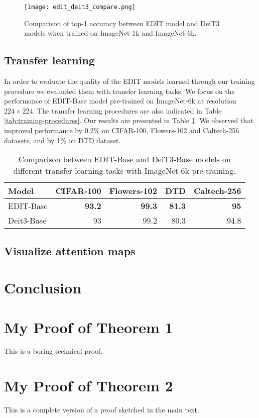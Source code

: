 \documentclass[anon,12pt]{colt2024} %
\begin{document}
\begin{figure}[h]
  \centering
  \texttt{[image: edit\_deit3\_compare.png]}
  \caption{Comparison of top-1 accuracy between EDIT model and DeiT3 models when trained on ImageNet-1k and ImageNet-6k.}\label{fig:comparison-edit-deit3}
\end{figure}

\subsection{Transfer learning}
In order to evaluate the quality of the EDIT models learned through our training procedure we evaluated them with transfer learning tasks.
We focus on the performance of EDIT-Base model pre-trained on ImageNet-6k at resolution $224 \times 224$. 
The transfer learning procedures are also indicated in Table \ref{tab:training-procedures}.
Our results are presented in Table \ref{tab:transfer-learning}.
We observed that improved performance by 0.2\% on CIFAR-100, Flowers-102 and Caltech-256 datasets, and by 1\% on DTD dataset.

\begin{table} [h!]
  \centering
  \begin{tabular}{l|rrrr}
    \hline
    Model & CIFAR-100 & Flowers-102 & DTD  & Caltech-256  \\
    \hline
    EDIT-Base & \textbf{93.2} & \textbf{99.3} & \textbf{81.3} & \textbf{95} \\
    Deit3-Base & 93 & 99.2 & 80.3 & 94.8 \\
    \hline
  \end{tabular}
  \caption{Comparison between EDIT-Base and DeiT3-Base models on different transfer learning tasks with ImageNet-6k pre-training.}
  \label{tab:transfer-learning}
\end{table}



\subsection{Visualize attention maps}

\section{Conclusion}





\appendix


\section{My Proof of Theorem 1}

This is a boring technical proof.

\section{My Proof of Theorem 2}

This is a complete version of a proof sketched in the main text.
\end{document}
